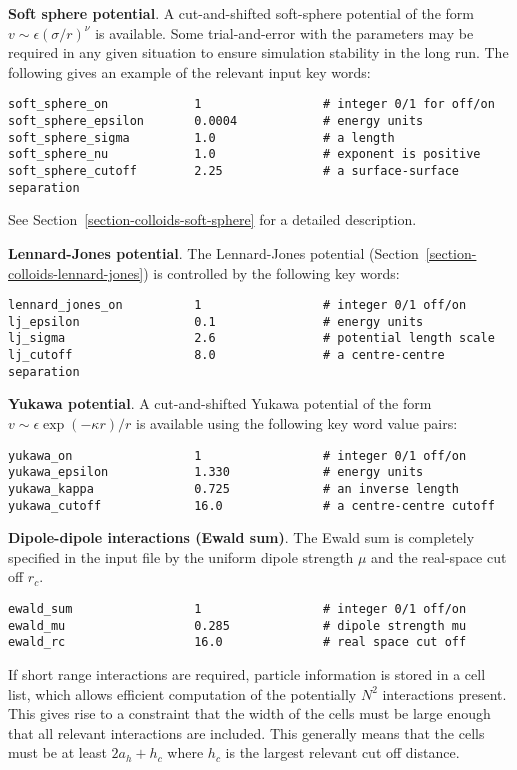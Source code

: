 {\bf Soft sphere potential}.
A cut-and-shifted soft-sphere potential of the form
$v \sim \epsilon (\sigma/r)^\nu$ is
available. Some trial-and-error with the parameters may be required in
any given situation to ensure simulation stability in the long run. The
following gives an example of the relevant input key words:
\begin{lstlisting}
soft_sphere_on            1                 # integer 0/1 for off/on 
soft_sphere_epsilon       0.0004            # energy units
soft_sphere_sigma         1.0               # a length
soft_sphere_nu            1.0               # exponent is positive
soft_sphere_cutoff        2.25              # a surface-surface separation
\end{lstlisting}
See Section~\ref{section-colloids-soft-sphere} for a detailed description.

{\bf Lennard-Jones potential}.
The Lennard-Jones potential (Section~\ref{section-colloids-lennard-jones})
is controlled by the following key words:
\begin{lstlisting}
lennard_jones_on          1                 # integer 0/1 off/on
lj_epsilon                0.1               # energy units
lj_sigma                  2.6               # potential length scale
lj_cutoff                 8.0               # a centre-centre separation
\end{lstlisting}


{\bf Yukawa potential}.
A cut-and-shifted Yukawa potential of the form
$v \sim \epsilon \exp(-\kappa r)/r$ is
available using the following key word value pairs:

\begin{lstlisting}
yukawa_on                 1                 # integer 0/1 off/on
yukawa_epsilon            1.330             # energy units
yukawa_kappa              0.725             # an inverse length
yukawa_cutoff             16.0              # a centre-centre cutoff
\end{lstlisting}

{\bf Dipole-dipole interactions (Ewald sum)}.
The Ewald sum is completely specified in the input file
by the uniform dipole strength $\mu$ and the real-space cut off $r_c$.  
\begin{lstlisting}
ewald_sum                 1                 # integer 0/1 off/on
ewald_mu                  0.285             # dipole strength mu
ewald_rc                  16.0              # real space cut off
\end{lstlisting}


If short range interactions are required, particle information is stored
in a cell list, which allows efficient computation of the potentially
$N^2$ interactions present. This gives rise to a constraint that the
width of the cells must be large enough that all relevant interactions
are included. This generally means that the cells must be at least
$2a_h + h_c$ where $h_c$ is the largest relevant cut off distance.

